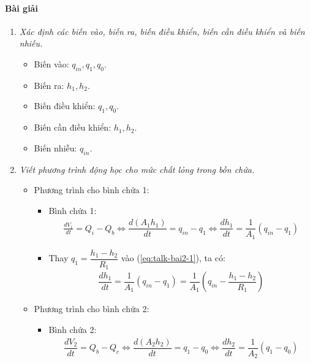 \paragraph{Bài giải}
    \begin{enumerate}[\it a.]
        \item \textit{Xác định các biến vào, biến ra, biến điều khiển, biến cần điều khiển và biến nhiễu.}
            \begin{itemize}
                \item Biến vào: $q_{in}, q_1, q_0$.
                \item Biến ra: $h_1, h_2$.
                \item Biến điều khiển: $q_1, q_0$.
                \item Biến cần điều khiển: $h_1, h_2$.
                \item Biến nhiễu: $q_{in}$.
            \end{itemize}

        \item \textit{Viết phương trình động học cho mức chất lỏng trong bồn chứa.}
            \begin{itemize}
                \item Phương trình cho bình chứa 1:
                    \begin{itemize}
                        \item Bình chứa 1:
                            \begin{align} \label{eq:talk-bai2-1}
                                \frac{dV_1}{dt} = Q_i - Q_b \Longleftrightarrow \dfrac{d\left({A_1 h_1}\right)}{dt} = q_{in} - q_1 \Longleftrightarrow \dfrac{dh_1}{dt} = \dfrac{1}{A_1} \left({q_{in} - q_1}\right)
                            \end{align}

                        \item Thay $q_1 = \dfrac{h_1 - h_2}{R_1}$ vào (\ref{eq:talk-bai2-1}), ta có:
                            \begin{align} \label{eq:talk-bai2-1-2}
                                \dfrac{dh_1}{dt} = \dfrac{1}{A_1} \left({q_{in} - q_1}\right) = \dfrac{1}{A_1} \left({q_{in} - \dfrac{h_1 - h_2}{R_1}}\right)
                            \end{align}
                    \end{itemize}

                \item Phương trình cho bình chứa 2:
                    \begin{itemize}
                        \item Bình chứa 2:
                            \begin{align} \label{eq:talk-bai2-2}
                                \dfrac{dV_2}{dt} = Q_b - Q_c \Longleftrightarrow \dfrac{d\left({A_2 h_2}\right)}{dt} = q_1 - q_0 \Longleftrightarrow \dfrac{dh_2}{dt} = \dfrac{1}{A_2} \left({q_1 - q_0}\right)
                            \end{align}


\end{itemize}
\end{itemize}
\end{enumerate}
